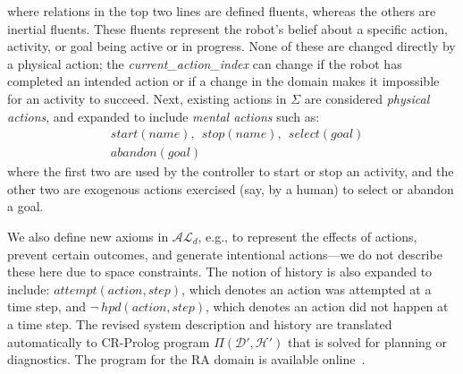 \documentclass[letterpaper, 10 pt, conference]{article}  %
\begin{document}
where relations in the top two lines are defined fluents, whereas the
others are inertial fluents. These fluents represent the robot's
belief about a specific action, activity, or goal being active or in
progress. None of these are changed directly by a physical action; the
\emph{current\_action\_index} can change if the robot has completed an
intended action or if a change in the domain makes it impossible for
an activity to succeed. Next, existing actions in $\Sigma$ are
considered \emph{physical actions}, and expanded to include
\emph{mental actions} such as:
\begin{align*}
  &start(name),~~stop(name),~~select(goal)\\
  &abandon(goal)
\end{align*}
where the first two are used by the controller to start or stop an
activity, and the other two are exogenous actions exercised (say, by a
human) to select or abandon a goal.

We also define new axioms in $\mathcal{AL}_d$, e.g., to represent the
effects of actions, prevent certain outcomes, and generate intentional
actions---we do not describe these here due to space constraints. The
notion of history is also expanded to include: $attempt(action,
step)$, which denotes an action was attempted at a time step, and
$\neg~hpd(action, step)$, which denotes an action did not happen at a
time step. The revised system description and history are translated
automatically to CR-Prolog program $\Pi(\mathcal{D}', \mathcal{H}')$
that is solved for planning or diagnostics. The program for the RA
domain is available online~\cite{code-results}.

\end{document}

